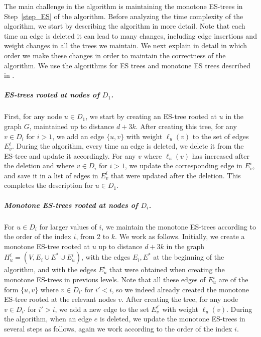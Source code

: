The main challenge in the algorithm is maintaining the monotone ES-trees in Step~\ref{step_ES} of the algorithm. Before analyzing the time complexity of the algorithm, we start by describing the algorithm in more detail. Note that each time an edge is deleted it can lead to many changes, including edge insertions and weight changes in all the trees we maintain. We next explain in detail in which order we make these changes in order to maintain the correctness of the algorithm. We use the algorithms for ES trees and monotone ES trees described in .

\subparagraph{ES-trees rooted at nodes of $D_1$.} 
First, for any node $u \in D_1$, we start by creating an ES-tree rooted at $u$ in the graph $G$, maintained up to distance $d+3k$. After creating this tree, for any $v \in D_i$ for $i > 1$, we add an edge $\{u,v\}$ with weight $\ell_u(v)$ to the set of edges $E_v^i$. During the algorithm, every time an edge is deleted, we delete it from the ES-tree and update it accordingly. For any $v$ where $\ell_u(v)$ has increased after the deletion and where $v \in D_i$ for $i > 1$, we update the corresponding edge in $E_v^i$, and save it in a list of edges in $E_v^i$ that were updated after the deletion. This completes the description for $u \in D_1$. 
\subparagraph{Monotone ES-trees rooted at nodes of $D_i$.}
For $u \in D_i$ for larger values of $i$, we maintain the monotone ES-trees according to the order of the index $i$, from 2 to $k$. We work as follows. Initially, we create a monotone ES-tree rooted at $u$ up to distance $d+3k$ in the graph $H_u^i=(V,E_i \cup E^* \cup E_u^i)$, with the edges $E_i,E^*$ at the beginning of the algorithm, and with the edges $E_u^i$ that were obtained when creating the monotone ES-trees in previous levels. Note that all these edges of $E_u^i$ are of the form $\{u,v\}$ where $v \in D_{i'}$ for $i' < i$, so we indeed already created the monotone ES-tree rooted at the relevant nodes $v$.  After creating the tree, for any node $v \in D_{i'}$ for $i' > i$, we add a new edge to the set $E_v^{i'}$ with weight $\ell_u(v)$.
During the algorithm, when an edge $e$ is deleted, we update the monotone ES-trees in several steps as follows, again we work according to the order of the index $i$.

